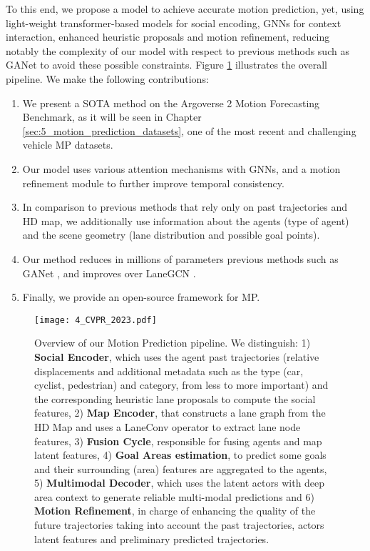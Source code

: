 To this end, we propose a model \cite{gomez2023improving} to achieve accurate motion prediction, yet, using light-weight transformer-based models for social encoding, \acp{GNN} for context interaction, enhanced heuristic proposals and motion refinement, reducing notably the complexity of our model with respect to previous methods such as GANet \cite{wang2022ganet} to avoid these possible constraints. Figure \ref{fig:4_CVPR_2023} illustrates the overall pipeline. We make the following contributions:

\begin{enumerate}
	\item We present a \ac{SOTA} method on the Argoverse 2 Motion Forecasting Benchmark, as it will be seen in Chapter \ref{sec:5_motion_prediction_datasets}, one of the most recent and challenging vehicle \ac{MP} datasets.
	\item Our model uses various attention mechanisms with GNNs, and a motion refinement module to further improve temporal consistency.
	\item In comparison to previous methods that rely only on past trajectories and HD map, we additionally use information about the agents (\eg type of agent) and the scene geometry (\eg lane distribution and possible goal points).
	\item Our method reduces in millions of parameters previous methods such as GANet \cite{wang2022ganet}, and improves over LaneGCN \cite{liang2020learning}.
	\item Finally, we provide an open-source framework for MP.
\end{enumerate}

\begin{figure}[h] 
	\centering
	\texttt{[image: 4\_CVPR\_2023.pdf]}
	\caption[Overview of our Motion Prediction model including Fusion Cycle, Heuristic Proposals and Motion Refinement]{Overview of our Motion Prediction pipeline. We distinguish: 1) \textbf{Social Encoder}, which uses the agent past trajectories (relative displacements and additional metadata such as the type (\eg car, cyclist, pedestrian) and category, from less to more important) and the corresponding heuristic lane proposals to compute the social features, 2) \textbf{Map Encoder}, that constructs a lane graph from the HD Map and uses a LaneConv operator \cite{liang2020learning} to extract lane node features, 3) \textbf{Fusion Cycle}, responsible for fusing agents and map latent features, 4) \textbf{Goal Areas estimation}, to predict some goals and their surrounding  (area) features are aggregated to the agents, 5) \textbf{Multimodal Decoder}, which uses the latent actors with deep area context to generate reliable multi-modal predictions and 6) \textbf{Motion Refinement}, in charge of enhancing the quality of the future trajectories taking into account the past trajectories, actors latent features and preliminary predicted trajectories.}
	\label{fig:4_CVPR_2023}
\end{figure}

